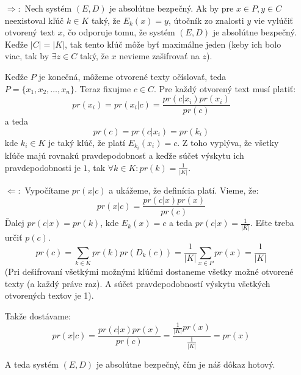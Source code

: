 \begin{dokaz}
    \noindent
    \begin{itemize}
    \item[$\Rightarrow:$] 
        Nech systém $(E,D)$ je absolútne bezpečný.
        Ak by pre $x \in P, y \in C$ neexistoval kľúč $k \in K$ taký, 
        že $E_k(x) = y$, útočník zo znalosti $y$ vie vylúčiť otvorený text $x$,
        čo odporuje tomu, že systém $(E,D)$ je absolútne bezpečný. 
        Keďže $|C|=|K|$, tak tento kľúč môže byť maximálne jeden 
        (keby ich bolo viac, tak by $\exists z \in C$ taký, že
        $x$ nevieme zašifrovať na $z$). 

        Keďže $P$ je konečná, môžeme otvorené texty očíslovať, 
        teda $P = \{ x_1, x_2, \dots, x_n\}$. 
        Teraz fixujme $c \in C$. Pre každý otvorený text musí platiť:
        \begin{equation*}
            pr(x_i) = pr(x_i | c) = \frac{pr(c | x_i) pr(x_i)}{pr(c)}
        \end{equation*}
        a teda
        \begin{equation*}
            pr(c) = pr(c | x_i) = pr(k_i)
        \end{equation*}
        kde $k_i \in K$ je taký kľúč, že platí $E_{k_i}(x_i)=c$. 
        Z toho vyplýva, že všetky kľúče majú rovnakú pravdepodobnosť a keďže
        súčet výskytu ich pravdepodobnosti je $1$, tak 
        $\forall k \in K\colon pr(k) = \frac{1}{|K|}$.

    \item [$\Leftarrow:$]
        Vypočítame $pr(x|c)$ a ukážeme, že definícia platí. Vieme, že:
        \begin{equation*}
            pr(x|c) = \frac{pr(c|x)pr(x)}{pr(c)}
        \end{equation*}
        Ďalej $pr(c|x) = pr(k)$, kde $E_k(x)=c$ a teda 
        $pr(c|x) = \frac{1}{|K|}$. Ešte treba určiť $p(c)$.
        \begin{equation*}
            pr(c) = \sum_{k \in K} pr(k) pr(D_k(c)) = 
                \frac{1}{|K|} \sum_{x \in P} pr(x) = \frac{1}{|K|}
        \end{equation*}
        (Pri dešifrovaní všetkými možnými kľúčmi dostaneme 
        všetky možné otvorené texty (a každý práve raz). 
        A súčet pravdepodobností výskytu všetkých otvorených textov je 1).

        Takže dostávame:
        \begin{equation*}
            pr(x|c) = \frac{pr(c|x)pr(x)}{pr(c)} = 
                \frac{\frac{1}{|K|} pr(x)}{\frac{1}{|K|}} = pr(x)
        \end{equation*}

        A teda systém $(E,D)$ je absolútne bezpečný, čím je náš dôkaz hotový.
    \end{itemize}
\end{dokaz}


